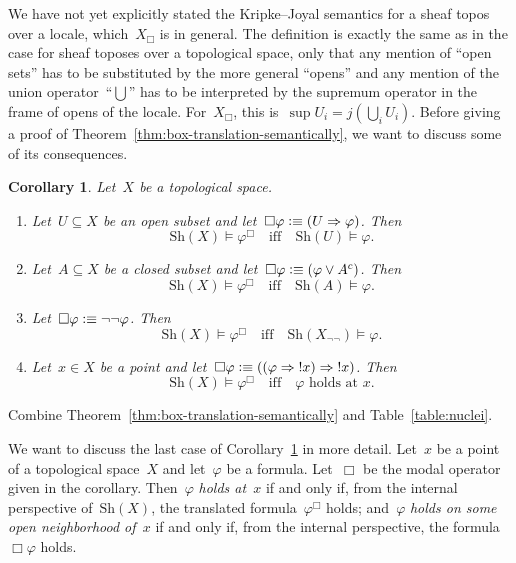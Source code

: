 \documentclass[10pt,reqno,a4paper]{amsbook}
\makeatletter
\theoremstyle{definition}
\theoremstyle{plain}
\newtheorem{cor}[defn]{Corollary}
\theoremstyle{remark}
\newcommand{\Sh}{\mathrm{Sh}}
\newcommand{\?}{\,{:}\,}
\renewcommand{\_}{\mathpunct{.}\,}
\newcommand{\notat}[1]{{!#1}}
\newcommand{\defequiv}{\vcentcolon\equiv}
\renewenvironment{proof}[1][\proofname]{\par
  \pushQED{\qed}%
  \normalfont \topsep6\p@\@plus6\p@\relax
  \trivlist
  \item[\hskip\labelsep
        \itshape
    #1\@addpunct{.}]\ignorespaces
}{%
  \popQED\endtrivlist\@endpefalse
}
\makeatother
\begin{document}
We have not yet explicitly stated the Kripke--Joyal semantics for a sheaf topos
over a locale, which~$X_\Box$ is in general. The definition is exactly the same
as in the case for sheaf toposes over a topological space, only that any
mention of ``open sets'' has to be substituted by the more general ``opens''
and any mention of the union operator~``$\bigcup$'' has to be interpreted by
the supremum operator in the frame of opens of the locale. For~$X_\Box$, this
is~$\sup U_i = j(\bigcup_i U_i)$. Before giving a proof of Theorem~\ref{thm:box-translation-semantically}, we want
to discuss some of its consequences.

\begin{cor}\label{cor:spreading}
Let~$X$ be a topological space.
\begin{enumerate}
\item Let~$U \subseteq X$ be an open subset and let~$\Box\varphi \defequiv (U
\Rightarrow \varphi)$. Then
\[ \Sh(X) \models \varphi^\Box \quad\text{iff}\quad \Sh(U) \models \varphi. \]
\item Let~$A \subseteq X$ be a closed subset and let~$\Box\varphi \defequiv
(\varphi \vee A^c)$. Then
\[ \Sh(X) \models \varphi^\Box \quad\text{iff}\quad \Sh(A) \models \varphi. \]
\item Let~$\Box\varphi \defequiv \neg\neg\varphi$. Then
\[ \Sh(X) \models \varphi^\Box \quad\text{iff}\quad \Sh(X_{\neg\neg}) \models \varphi. \]
\item Let~$x \in X$ be a point and let~$\Box\varphi \defequiv ((\varphi
\Rightarrow \notat{x}) \Rightarrow \notat{x})$. Then
\[ \Sh(X) \models \varphi^\Box \quad\text{iff}\quad \text{$\varphi$ holds
at~$x$}. \]
\end{enumerate}
\end{cor}
\begin{proof}Combine Theorem~\ref{thm:box-translation-semantically} and
Table~\ref{table:nuclei}.\end{proof}

We want to discuss the last case of Corollary~\ref{cor:spreading} in more detail. Let~$x$ be a
point of a topological space~$X$ and let~$\varphi$ be a formula. Let~$\Box$ be
the modal operator given in the corollary. Then~$\varphi$ \emph{holds at~$x$}
if and only if, from the internal perspective of~$\Sh(X)$, the translated
formula~$\varphi^\Box$ holds; and~$\varphi$ \emph{holds on some open
neighborhood of~$x$} if and only if, from the internal perspective, the
formula~$\Box\varphi$ holds.
\end{document}
